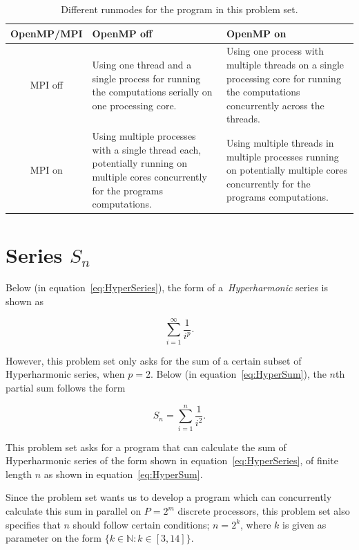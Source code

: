 \documentclass[fontsize=11pt,paper=a4,titlepage]{report}
\begin{document}
\begin{table}[h]
	\begin{tabularx}{\linewidth}{c|X|X|}
			OpenMP/MPI	& OpenMP off & OpenMP on	\\ \hline
			MPI off		& Using one thread and a single process for running the
computations serially on one processing core. & Using one process with multiple
threads on a single processing core for running the computations concurrently
across the threads. \\ \hline
			MPI on		& Using multiple processes with a single thread each,
potentially running on multiple cores concurrently for the programs
computations. & Using multiple threads in multiple processes running on
potentially multiple cores concurrently for the programs computations. \\
\hline
	\end{tabularx}
	\caption{Different runmodes for the program in this problem set.}
	\label{tab:RunModes}
\end{table}

\section{Series $S_n$}

Below (in equation~\ref{eq:HyperSeries}), the form of a~\textit{Hyperharmonic}
series is shown as

\begin{equation}
	\sum_{i=1}^{\infty} \frac{1}{i^p}.
	\label{eq:HyperSeries}
\end{equation}

However, this problem set only asks for the sum of a certain subset of
Hyperharmonic series, when $p = 2$. Below (in equation~\ref{eq:HyperSum}), the
$n$th partial sum follows the form

\begin{equation}
	S_n = \sum_{i=1}^{n} \frac{1}{i^2}.
	\label{eq:HyperSum}
\end{equation}

This problem set asks for a program that can calculate the sum of Hyperharmonic
series of the form shown in equation~\ref{eq:HyperSeries}, of finite length $n$
as shown in equation~\ref{eq:HyperSum}.

Since the problem set wants us to develop a program which can concurrently
calculate this sum in parallel on $P = 2^m$ discrete processors, this problem
set also specifies that $n$ should follow certain conditions; $n = 2^k$, where
$k$ is given as parameter on the form $\{k \in \mathbb{N} : k \in [3, 14]\}$.
\end{document}
